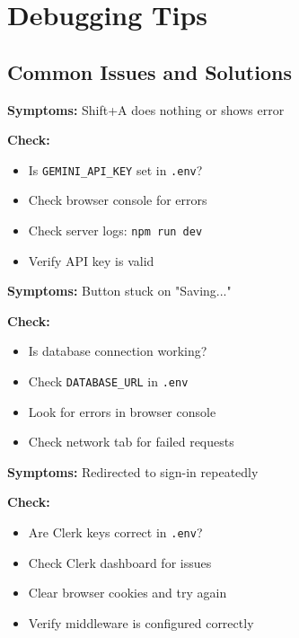 \documentclass[11pt,a4paper]{article}
\begin{document}
\section{Debugging Tips}

\subsection{Common Issues and Solutions}

\begin{tcolorbox}[colback=red!5!white,colframe=red!75!black,title=Issue: AI completion not working]
\textbf{Symptoms:} Shift+A does nothing or shows error

\textbf{Check:}
\begin{itemize}
    \item Is \texttt{GEMINI\_API\_KEY} set in \texttt{.env}?
    \item Check browser console for errors
    \item Check server logs: \texttt{npm run dev}
    \item Verify API key is valid
\end{itemize}
\end{tcolorbox}

\begin{tcolorbox}[colback=red!5!white,colframe=red!75!black,title=Issue: Notes not saving]
\textbf{Symptoms:} Button stuck on "Saving..."

\textbf{Check:}
\begin{itemize}
    \item Is database connection working?
    \item Check \texttt{DATABASE\_URL} in \texttt{.env}
    \item Look for errors in browser console
    \item Check network tab for failed requests
\end{itemize}
\end{tcolorbox}

\begin{tcolorbox}[colback=red!5!white,colframe=red!75!black,title=Issue: Authentication not working]
\textbf{Symptoms:} Redirected to sign-in repeatedly

\textbf{Check:}
\begin{itemize}
    \item Are Clerk keys correct in \texttt{.env}?
    \item Check Clerk dashboard for issues
    \item Clear browser cookies and try again
    \item Verify middleware is configured correctly
\end{itemize}
\end{tcolorbox}
\end{document}
